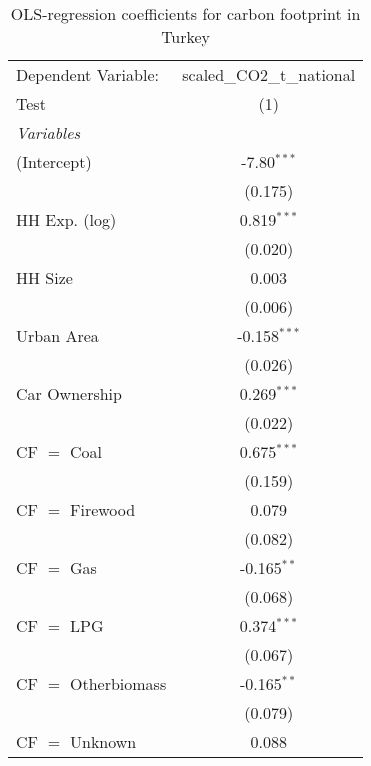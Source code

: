 
\begin{table}[htbp!]
   \centering
   \small
   \begin{adjustbox}{width = 1\textwidth, max height = 0.95\textheight, center}
      \begin{threeparttable}[b]
         \caption{\label{tab:OLS_2_TUR} OLS-regression coefficients for carbon footprint in Turkey}
         \begin{tabular}{lc}
            \tabularnewline \midrule \midrule
            Dependent Variable: & scaled\_CO2\_t\_national\\     
            Test                & (1)\\  
            \midrule
            \emph{Variables}\\
            (Intercept)         & -7.80$^{***}$\\   
                                & (0.175)\\   
            HH Exp. (log)       & 0.819$^{***}$\\   
                                & (0.020)\\   
            HH Size             & 0.003\\   
                                & (0.006)\\   
            Urban Area          & -0.158$^{***}$\\   
                                & (0.026)\\   
            Car Ownership       & 0.269$^{***}$\\   
                                & (0.022)\\   
            CF $=$ Coal         & 0.675$^{***}$\\   
                                & (0.159)\\   
            CF $=$ Firewood     & 0.079\\   
                                & (0.082)\\   
            CF $=$ Gas          & -0.165$^{**}$\\   
                                & (0.068)\\   
            CF $=$ LPG          & 0.374$^{***}$\\   
                                & (0.067)\\   
            CF $=$ Otherbiomass & -0.165$^{**}$\\   
                                & (0.079)\\   
            CF $=$ Unknown      & 0.088\\   

\end{tabular}
\end{threeparttable}
\end{adjustbox}
\end{table}
